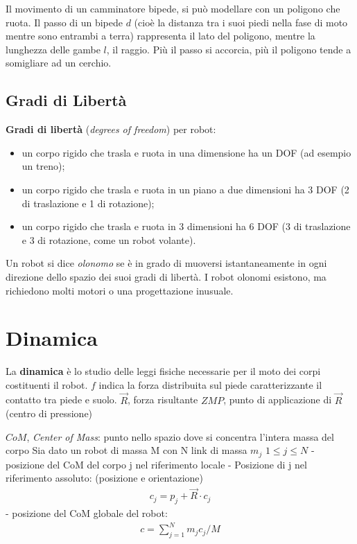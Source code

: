 \documentclass[a4paper,portrait,12pt]{article}
\theoremstyle{definition}
\begin{document}
Il movimento di un camminatore bipede, si può modellare con un poligono che ruota.
Il passo di un bipede $d$ (cioè la distanza tra i suoi piedi nella fase di moto mentre sono entrambi a terra) rappresenta il lato del poligono, mentre la lunghezza delle gambe $l$, il raggio.
Più il passo si accorcia, più il poligono tende a somigliare ad un cerchio.  

\subsection{Gradi di Libertà}
\textbf{Gradi di libertà} (\emph{degrees of freedom}) per robot:
\begin{itemize}
\item un corpo rigido che trasla e ruota in una dimensione ha un DOF (ad esempio un treno);
\item un corpo rigido che trasla e ruota in un piano a due dimensioni ha 3 DOF (2 di traslazione e 1 di rotazione);
\item un corpo rigido che trasla e ruota in 3 dimensioni ha 6 DOF (3 di traslazione e 3 di rotazione, come un robot volante).
\end{itemize}

Un robot si dice \emph{olonomo} se è in grado di muoversi istantaneamente in ogni direzione dello spazio dei suoi gradi di libertà.
I robot olonomi esistono, ma richiedono molti motori o una progettazione inusuale.



\section{Dinamica}



La \textbf{dinamica} è lo studio delle leggi fisiche necessarie per il moto dei corpi costituenti il robot.
$f$ indica la forza distribuita sul piede caratterizzante il contatto tra piede e suolo.
$\vec{R}$, forza risultante
$ZMP$, punto di applicazione di $\vec{R}$ (centro di pressione)

$CoM$, \emph{Center of Mass}: punto nello spazio dove si concentra l’intera massa del corpo
Sia dato un robot di massa M con N link di massa $m_j$
$1 \le j \le N$
- posizione del CoM del corpo j nel riferimento locale
- Posizione di j nel riferimento assoluto: (posizione e orientazione)
\begin{align*}
c_j = p_j + \vec{R} \cdot c_j
\end{align*}
- posizione del CoM globale del robot:
\begin{align*}
c = \sum_{j=1}^N m_j c_j /M
\end{align*}
\end{document}

